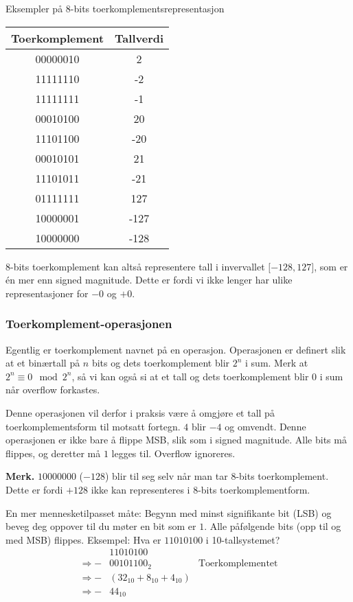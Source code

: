 \documentclass[12pt,a4paper,norsk]{article}
\begin{document}
\begin{center}
  Eksempler på 8-bits toerkomplementsrepresentasjon\\[5mm]
  \begin{tabular}{c|c}
    \toprule
    Toerkomplement & Tallverdi \\
    \midrule
    00000010 & 2 \\
    11111110 & -2 \\
    11111111 & -1 \\
    00010100 & 20 \\
    11101100 & -20 \\
    00010101 & 21 \\
    11101011 & -21 \\
    01111111 & 127 \\
    10000001 & -127 \\
    10000000 & -128 \\
    \bottomrule
  \end{tabular}
\end{center}

8-bits toerkomplement kan altså representere tall i invervallet $\lbrack-128,127\rbrack$,
som er én mer enn signed magnitude. Dette er fordi vi ikke lenger har ulike
representasjoner for $-0$ og $+0$.

\subsubsection{Toerkomplement-operasjonen}\label{sec:toerkomplement-op}
Egentlig er toerkomplement navnet på en operasjon. Operasjonen er definert slik
at et binærtall på $n$ bits og dets toerkomplement blir $2^n$ i sum. Merk at
$2^n \equiv 0 \mod 2^n$, så vi kan også si at et tall og dets toerkomplement blir $0$
i sum når overflow forkastes.

Denne operasjonen vil derfor i praksis være å omgjøre et tall på
toerkomplementsform til motsatt fortegn. $4$ blir $-4$ og omvendt. Denne
operasjonen er ikke bare å flippe MSB, slik som i signed magnitude. Alle bits må
flippes, og deretter må $1$ legges til. Overflow ignoreres.

\textbf{Merk.} $10000000$ ($-128$) blir til seg selv når man
tar 8-bits toerkomplement. Dette er fordi $+128$ ikke kan representeres i 8-bits
toerkomplementform.

En mer mennesketilpasset måte: Begynn med minst signifikante bit (LSB) og beveg
deg oppover til du møter en bit som er $1$. Alle påfølgende bits (opp til og med
MSB) flippes. Eksempel: Hva er $11010100$ i 10-tallsystemet?
%
\begin{align*}
  &11010100 \\
  \Rightarrow - &00101100_2 & \text{Toerkomplementet} \\
  \Rightarrow - &(32_{10} + 8_{10} + 4_{10}) \\
  \Rightarrow - &44_{10}
\end{align*}
\end{document}
